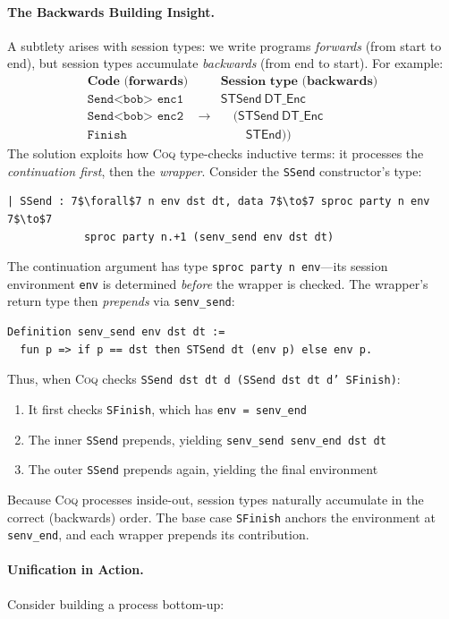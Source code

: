 \documentclass[11pt]{article}
\newcommand{\coqin}[1]{\texttt{#1}}
\newcommand{\coq}{\textsc{Coq}}
\begin{document}
\paragraph{The Backwards Building Insight.}
A subtlety arises with session types: we write programs \emph{forwards}
(from start to end), but session types accumulate \emph{backwards}
(from end to start). For example:
\[
\begin{array}{lcl}
\textbf{Code (forwards)} & & \textbf{Session type (backwards)} \\[2pt]
\coqin{Send<bob> enc1} & & \mathsf{STSend~DT\_Enc} \\
\coqin{Send<bob> enc2} & \longrightarrow & \quad(\mathsf{STSend~DT\_Enc} \\
\coqin{Finish} & & \quad\quad\mathsf{STEnd}))
\end{array}
\]
The solution exploits how \coq{} type-checks inductive terms: it processes
the \emph{continuation first}, then the \emph{wrapper}. Consider the
\coqin{SSend} constructor's type:
\begin{verbatim}
| SSend : 7$\forall$7 n env dst dt, data 7$\to$7 sproc party n env 7$\to$7
            sproc party n.+1 (senv_send env dst dt)
\end{verbatim}
The continuation argument has type \coqin{sproc party n env}---its session
environment \coqin{env} is determined \emph{before} the wrapper is checked.
The wrapper's return type then \emph{prepends} via \coqin{senv\_send}:
\begin{verbatim}
Definition senv_send env dst dt :=
  fun p => if p == dst then STSend dt (env p) else env p.
\end{verbatim}
Thus, when \coq{} checks \coqin{SSend dst dt d (SSend dst dt d' SFinish)}:
\begin{enumerate}
  \item It first checks \coqin{SFinish}, which has \coqin{env = senv\_end}
  \item The inner \coqin{SSend} prepends, yielding \coqin{senv\_send senv\_end dst dt}
  \item The outer \coqin{SSend} prepends again, yielding the final environment
\end{enumerate}
Because \coq{} processes inside-out, session types naturally accumulate
in the correct (backwards) order. The base case \coqin{SFinish} anchors the
environment at \coqin{senv\_end}, and each wrapper prepends its contribution.

\paragraph{Unification in Action.}
Consider building a process bottom-up:
\end{document}
